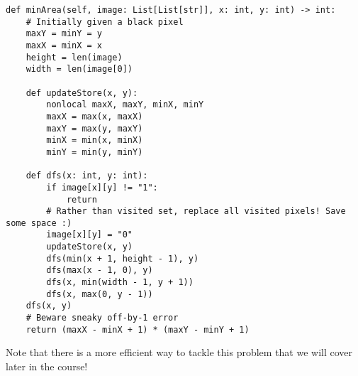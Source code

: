 \documentclass{article}
\begin{document}
\begin{verbatim}
def minArea(self, image: List[List[str]], x: int, y: int) -> int:
    # Initially given a black pixel
    maxY = minY = y
    maxX = minX = x
    height = len(image)
    width = len(image[0])

    def updateStore(x, y):
        nonlocal maxX, maxY, minX, minY
        maxX = max(x, maxX)
        maxY = max(y, maxY)
        minX = min(x, minX)
        minY = min(y, minY)
    
    def dfs(x: int, y: int):
        if image[x][y] != "1":
            return
        # Rather than visited set, replace all visited pixels! Save some space :)
        image[x][y] = "0"
        updateStore(x, y)
        dfs(min(x + 1, height - 1), y)
        dfs(max(x - 1, 0), y)
        dfs(x, min(width - 1, y + 1))
        dfs(x, max(0, y - 1))
    dfs(x, y)
    # Beware sneaky off-by-1 error
    return (maxX - minX + 1) * (maxY - minY + 1)
\end{verbatim}

Note that there is a more efficient way to tackle this problem that we will cover later in the course!
\end{document}
